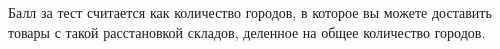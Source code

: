 Балл за тест считается как количество городов, в которое вы можете доставить товары с такой расстановкой складов, деленное на общее количество городов.